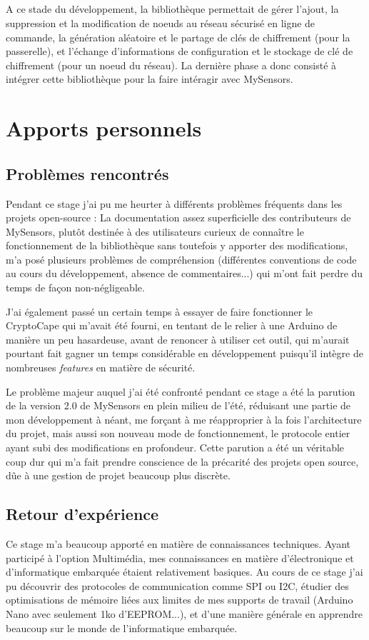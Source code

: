 \documentclass[12 pt]{report}
\begin{document}
\paragraph{}A ce stade du développement, la bibliothèque permettait de gérer l'ajout, la suppression et la modification de noeuds au réseau sécurisé en ligne de commande, la génération aléatoire et le partage de clés de chiffrement (pour la passerelle), et l'échange d'informations de configuration et le stockage de clé de chiffrement (pour un noeud du réseau). La dernière phase a donc consisté à intégrer cette bibliothèque pour la faire intéragir avec MySensors.


\chapter{Apports personnels}
\section{Problèmes rencontrés}
Pendant ce stage j'ai pu me heurter à différents problèmes fréquents dans les projets open-source : La documentation assez superficielle des contributeurs de MySensors, plutôt destinée à des utilisateurs curieux de connaître le fonctionnement de la bibliothèque sans toutefois y apporter des modifications, m'a posé plusieurs problèmes de compréhension (différentes conventions de code au cours du développement, absence de commentaires...) qui m'ont fait perdre du temps de façon non-négligeable.

J'ai également passé un certain temps à essayer de faire fonctionner le CryptoCape qui m'avait été fourni, en tentant de le relier à une Arduino de manière un peu hasardeuse, avant de renoncer à utiliser cet outil, qui m'aurait pourtant fait gagner un temps considérable en développement puisqu'il intègre de nombreuses \emph{features} en matière de sécurité.

Le problème majeur auquel j'ai été confronté pendant ce stage a été la parution de la version 2.0 de MySensors en plein milieu de l'été, réduisant une partie de mon développement à néant, me forçant à me réapproprier à la fois l'architecture du projet, mais aussi son nouveau mode de fonctionnement, le protocole entier ayant subi des modifications en profondeur. Cette parution a été un véritable coup dur qui m'a fait prendre conscience de la précarité des projets open source, dûe à une gestion de projet beaucoup plus discrète.

\section{Retour d'expérience}
Ce stage m'a beaucoup apporté en matière de connaissances techniques. Ayant participé à l'option Multimédia, mes connaissances en matière d'électronique et d'informatique embarquée étaient relativement basiques. Au cours de ce stage j'ai pu découvrir des protocoles de communication comme SPI ou I2C, étudier des optimisations de mémoire liées aux limites de mes supports de travail (Arduino Nano avec seulement 1ko d'EEPROM...), et d'une manière générale en apprendre beaucoup sur le monde de l'informatique embarquée.
\end{document}
